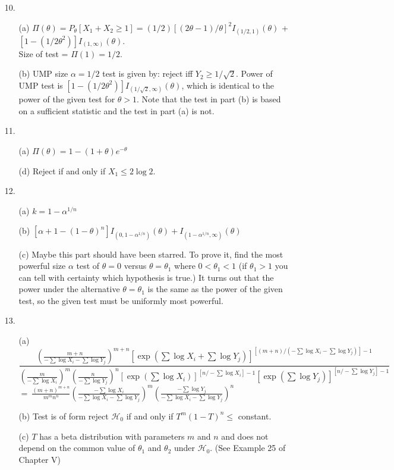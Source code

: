 \begin{enumerate}
  	\item[10.] \begin{enumerate}
  		\item[(a)] $\Pi(\theta) = P_\theta[X_1+X_2\ge 1] = (1/2)[(2\theta-1)/\theta]^2I_{(1/2,1)}(\theta)$ + $[1-(1/2\theta^2)]I_{(1,\infty)}(\theta).$ \\ Size of test = $\Pi(1) = 1/2$.
  		\item[(b)] UMP size $\alpha = 1/2$ test is given by: reject iff $Y_2 \ge 1/\sqrt{2}$. Power of UMP test is $[1-(1/2\theta^2)]I_{(1/\sqrt{2},\infty)}(\theta)$, which is identical to the power of the given test for $\theta>1$. Note that the test in part (b) is based on a sufficient statistic and the test in part (a) is not. 
  	\end{enumerate}
  
	\item[11.] \begin{enumerate}
		\item[(a)] $\Pi(\theta) = 1 - (1+\theta)e^{-\theta}$
		\item[(d)] Reject if and only if $X_1 \le 2\log 2$.
	\end{enumerate}

	\item[12.] \begin{enumerate}
		\item[(a)] $k = 1 - \alpha^{1/n}$
		\item[(b)] $[\alpha + 1-(1-\theta)^n]I_{(0,1-\alpha^{1/n})}(\theta) + I_{(1-\alpha^{1/n},\infty)}(\theta)$
		\item[(c)] Maybe this part should have been starred. To prove it, find the most powerful size $\alpha$ test of $\theta=0$ versus $\theta=\theta_1$ where $0< \theta_1< 1$ (if $\theta_1>1$ you can tell with certainty which hypothesis is true.) It turns out that the power under the alternative $\theta=\theta_1$ is the same as the power of the given test, so the given test must be uniformly most powerful.
	\end{enumerate}
	
	\newpage
	
	\item[13.] \begin{enumerate}
		\item[(a)] $\dfrac{\left(\frac{m+n}{-\sum\log X_i - \sum\log Y_j}\right)^{m+n}[\exp(\sum\log X_i + \sum\log Y_j)]^{[(m+n)/(-\sum\log X_i -\sum\log Y_j)]-1}}{\left(\frac{m}{-\sum\log X_i}\right)^m\left(\frac{n}{-\sum\log Y_j}\right)^n[\exp(\sum\log X_i)]^{[n/-\sum\log X_i]-1}[\exp(\sum\log Y_j)]^{[n/-\sum\log Y_j]-1}}$ \\
		$=\ \frac{(m+n)^{m+n}}{m^mn^n}\left(\frac{-\sum\log X_i}{-\sum\log X_i-\sum\log Y_j}\right)^m \left(\frac{-\sum\log Y_j}{-\sum\log X_i-\sum\log Y_j}\right)^n$
		\item[(b)] Test is of form reject $\mathscr{H}_0$ if and only if $T^m(1-T)^n \le$ constant.
		\item[(c)] $T$ has a beta distribution with parameters $m$ and $n$ and does not depend on the common value of $\theta_1$ and $\theta_2$ under $\mathscr{H}_0$. (See Example 25 of Chapter V)
	\end{enumerate}
	

\end{enumerate}
